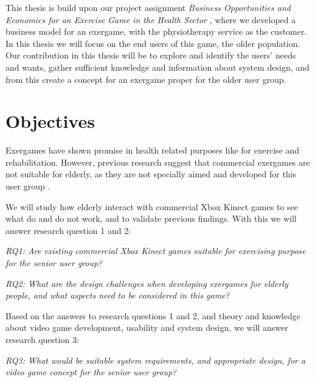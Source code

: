 This thesis is build upon our project assignment \emph{Business Opportunities and Economics for an Exercise Game in the Health Sector} \cite{project}, where we developed a business model for an exergame, with the physiotherapy service as the customer. In this thesis we will focus on the end users of this game, the older population. Our contribution in this thesis will be to explore and identify the users' needs and wants, gather sufficient knowledge and information about system design, and from this create a concept for an exergame proper for the older user group.

\section{Objectives}
\label{sec:researchq} Exergames have shown promise in health related purposes like for exercise and rehabilitation. However, previous research suggest that commercial exergames are not suitable for elderly, as they are not specially aimed and developed for this user group \cite{exergamesforelderly} \cite{gerling2} \cite{bruin} \cite{project}. 

We will study how elderly interact with commercial Xbox Kinect games to see what do and do not work, and to validate previous findings. With this we will answer research question 1 and 2: 

\emph{RQ1: Are existing commercial Xbox Kinect games suitable for exercising purpose for the senior user group?} 

\emph{RQ2: What are the design challenges when developing exergames for elderly people, and what aspects need to be considered in this game?}

Based on the answers to research questions 1 and 2, and theory and knowledge about video game development, usability and system design, we will answer research question 3:

\emph{RQ3: What would be suitable system requirements, and appropriate design, for a video game concept for the senior user group?}


